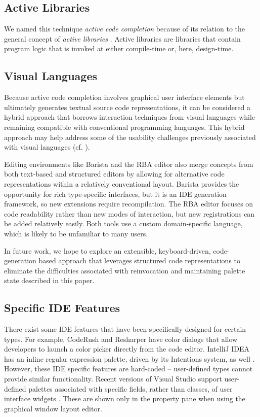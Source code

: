 \documentclass[10pt, conference, compsocconf]{IEEEtran}
\begin{document}
\subsection{Active Libraries}
We named this technique {\it active code completion} because of its relation to the general concept of {\it active libraries} \cite{activelibraries}. Active libraries are libraries that contain program logic that is invoked at either compile-time or, here, design-time. 

\subsection{Visual Languages}
Because active code completion involves graphical user interface elements but ultimately generates textual source code representations, it can be considered a hybrid approach that borrows interaction techniques from visual languages while remaining compatible with conventional programming languages. This hybrid approach may help address some of the usability challenges previously associated with visual languages (cf. \cite{doi:10.1080/1049482940040202}).

Editing environments like Barista \cite{Ko06} and the RBA editor \cite{RBA} also merge concepts from both text-based and structured editors by allowing for alternative code representations within a relatively conventional layout. Barista provides the opportunity for rich type-specific interfaces, but it is an IDE generation framework, so new extensions require recompilation. The RBA editor focuses on code readability rather than new modes of interaction, but new registrations can be added relatively easily. Both tools use a custom domain-specific language, which is likely to be unfamiliar to many users. 

In future work, we hope to explore an extensible, keyboard-driven, code-generation based approach that leverages structured code representations to eliminate the difficulties associated with reinvocation and maintaining palette state described in this paper.

\subsection{Specific IDE Features}
There exist some IDE features that have been specifically designed for certain types. For example, CodeRush \cite{CodeRush} and Resharper \cite{Resharper} have color dialogs that allow developers to launch a color picker directly from the code editor. IntelliJ IDEA has an inline regular expression palette, driven by its Intentions system, as well \cite{IntelliJRegexp}. However, these IDE specific features are hard-coded -- user-defined types cannot provide similar functionality. Recent versions of Visual Studio support user-defined palettes associated with specific fields, rather than classes, of user interface widgets \cite{VSWidgets}. These are shown only in the property pane when using the graphical window layout editor.
\end{document}
